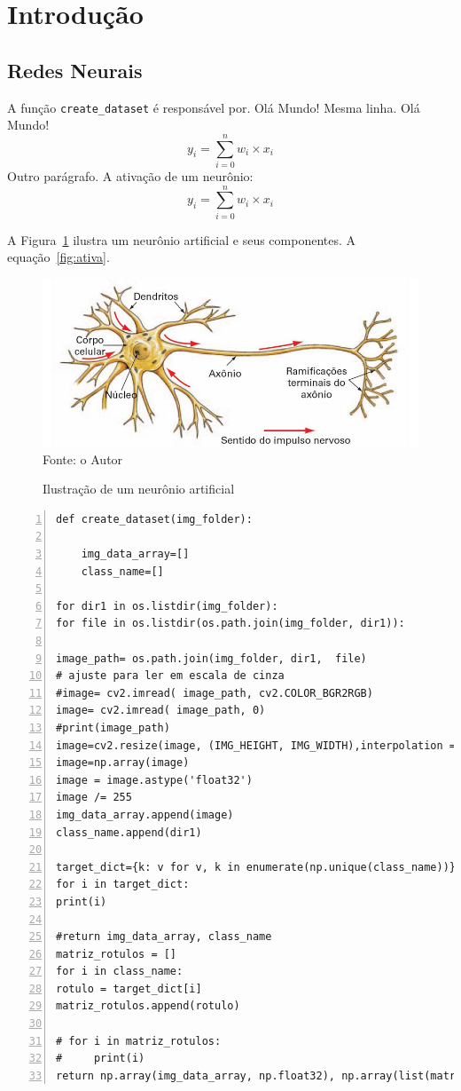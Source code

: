 \documentclass[a4paper, 12pt]{article}
\newcommand{\cf}[1]               {\texttt{#1}}
\begin{document}
\section{Introdução}
\subsection{Redes Neurais}

A função \cf{create\_dataset} é responsável por.
Olá       Mundo!
Mesma linha.
Olá       Mundo!
\begin{equation}
	y_i = \sum_{i=0}^{n} w_i \times x_i
	\label{eq:teste}
\end{equation}
Outro parágrafo.
A ativação de um neurônio:
\begin{equation}
y_i = \sum_{i=0}^{n} w_i \times x_i
\label{fig:ativa}
\end{equation}

A Figura~\ref{fig:neuronio} ilustra um neurônio artificial e seus componentes.
A equação~\ref{fig:ativa}.

\begin{figure}[htb]
	\caption{Ilustração de um neurônio artificial}\label{fig:neuronio}
	\centering
\includegraphics[scale=.7]{neuronio}
Fonte: o Autor
\end{figure}
\lstset{language=Python}
\begin{lstlisting}[frame=single, numbers=left, caption=Função]
def create_dataset(img_folder):

	img_data_array=[]
	class_name=[]

for dir1 in os.listdir(img_folder):
for file in os.listdir(os.path.join(img_folder, dir1)):

image_path= os.path.join(img_folder, dir1,  file)
# ajuste para ler em escala de cinza
#image= cv2.imread( image_path, cv2.COLOR_BGR2RGB)
image= cv2.imread( image_path, 0)
#print(image_path)
image=cv2.resize(image, (IMG_HEIGHT, IMG_WIDTH),interpolation = cv2.INTER_AREA)
image=np.array(image)
image = image.astype('float32')
image /= 255 
img_data_array.append(image)
class_name.append(dir1)

target_dict={k: v for v, k in enumerate(np.unique(class_name))}
for i in target_dict:
print(i)

#return img_data_array, class_name
matriz_rotulos = []
for i in class_name:
rotulo = target_dict[i]
matriz_rotulos.append(rotulo)

# for i in matriz_rotulos:
#     print(i)
return np.array(img_data_array, np.float32), np.array(list(matriz_rotulos), np.float32)	
\end{lstlisting}
\end{document}
